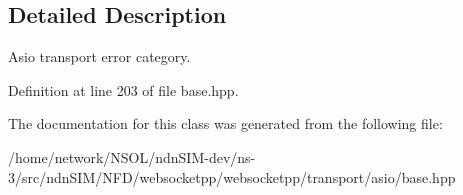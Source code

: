 \subsection{Detailed Description}
Asio transport error category. 

Definition at line 203 of file base.\+hpp.



The documentation for this class was generated from the following file\+:\begin{DoxyCompactItemize}
\item 
/home/network/\+N\+S\+O\+L/ndn\+S\+I\+M-\/dev/ns-\/3/src/ndn\+S\+I\+M/\+N\+F\+D/websocketpp/websocketpp/transport/asio/base.\+hpp\end{DoxyCompactItemize}
